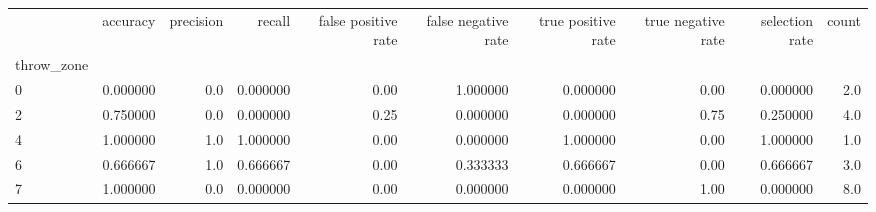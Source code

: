 \begin{tabular}{lrrrrrrrrr}
\toprule
{} &  accuracy &  precision &    recall &  false positive rate &  false negative rate &  true positive rate &  true negative rate &  selection rate &  count \\
throw\_zone &           &            &           &                      &                      &                     &                     &                 &        \\
\midrule
0          &  0.000000 &        0.0 &  0.000000 &                 0.00 &             1.000000 &            0.000000 &                0.00 &        0.000000 &    2.0 \\
2          &  0.750000 &        0.0 &  0.000000 &                 0.25 &             0.000000 &            0.000000 &                0.75 &        0.250000 &    4.0 \\
4          &  1.000000 &        1.0 &  1.000000 &                 0.00 &             0.000000 &            1.000000 &                0.00 &        1.000000 &    1.0 \\
6          &  0.666667 &        1.0 &  0.666667 &                 0.00 &             0.333333 &            0.666667 &                0.00 &        0.666667 &    3.0 \\
7          &  1.000000 &        0.0 &  0.000000 &                 0.00 &             0.000000 &            0.000000 &                1.00 &        0.000000 &    8.0 \\
\bottomrule
\end{tabular}
